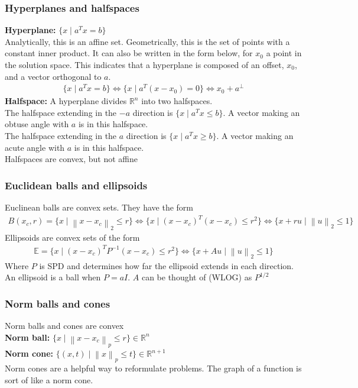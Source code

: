 \documentclass{article}
\newcommand{\norm}[2]{\left\lVert#1\right\rVert_#2}
\begin{document}
\subsubsection{Hyperplanes and halfspaces}
\textbf{Hyperplane:} $\{x \mid a^Tx = b\}$\\
Analytically, this is an affine set. Geometrically, this is the set of points with a constant inner product. It can also be written in the form below, for $x_0$ a point in the solution space. This indicates that a hyperplane is composed of an offset, $x_0$, and a vector orthogonal to $a$.
\begin{align*}
  \{x \mid a^Tx = b\} \Longleftrightarrow \{x \mid a^T(x - x_0) = 0\} \Longleftrightarrow x_0 + a^\perp
\end{align*} 
\textbf{Halfspace:} A hyperplane divides $\mathbb{R}^n$ into two halfspaces.\\
The halfspace extending in the $-a$ direction is $\{x \mid a^Tx \leq b\}$. A vector making an obtuse angle with $a$ is in this halfspace.\\
The halfspace extending in the $a$ direction is $\{x \mid a^Tx \geq b\}$. A vector making an acute angle with $a$ is in this halfspace.\\
Halfspaces are convex, but not affine

\subsubsection{Euclidean balls and ellipsoids}
Euclinean balls are convex sets. They have the form
\begin{align*}
  B(x_c, r) = \{x \mid \norm{x - x_c}{2} \leq r\} \Longleftrightarrow \{x \mid (x - x_c)^T(x - x_c) \leq r^2\} \Longleftrightarrow \{x + ru \mid \norm{u}{2} \leq 1\}
\end{align*}
Ellipsoids are convex sets of the form
\begin{align*}
  \mathbb{E} = \{x \mid (x - x_c)^TP^{-1}(x - x_c) \leq r^2\} \Longleftrightarrow \{x + Au \mid \norm{u}{2} \leq 1\}
\end{align*}
Where $P$ is SPD and determines how far the ellipsoid extends in each direction. An ellipsoid is a ball when $P = aI$. $A$ can be thought of (WLOG) as $P^{1/2}$

\subsubsection{Norm balls and cones}
Norm balls and cones are convex\\
\textbf{Norm ball:} $\{ x \mid \norm{x - x_c}{p} \leq r \} \in \mathbb{R}^n$\\
\textbf{Norm cone:} $\{ (x,t) \mid \norm{x}{p} \leq t \} \in \mathbb{R}^{n+1}$\\
Norm cones are a helpful way to reformulate problems. The graph of a function is sort of like a norm cone. 
\end{document}

